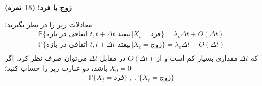 \Large \textbf{زوج یا فرد!}
\large \textbf{(15 نمره)}

\normalsize \vspace{0.5cm}
 
معادلات زیر را در نظر بگیرید؛
$$
\begin{aligned}
    \mathbb{P}\{\text{اتفاقی در بازه $t,t+\Delta t$ بیفتد}|X_t=\text{فرد}\}=\lambda_o \Delta t+O(\Delta t)\\
    \mathbb{P}\{\text{اتفاقی در بازه $t,t+\Delta t$ بیفتد}|X_t=\text{زوج}\}=\lambda_e \Delta t+O(\Delta t)\\
\end{aligned}
$$
که 
$\Delta t$ مقداری بسیار کم است و از 
$O(\Delta t)$ در مقابل 
$\Delta t$ می‌توان صرف نظر کرد. اگر 
$X_0=0$ باشد، 
دو عبارت زیر را حساب کنید؛
$$
\begin{aligned}
    \mathbb{P}\{X_t=\text{فرد}\}\ , \ \mathbb{P}\{X_t=\text{زوج}\}
\end{aligned}
$$